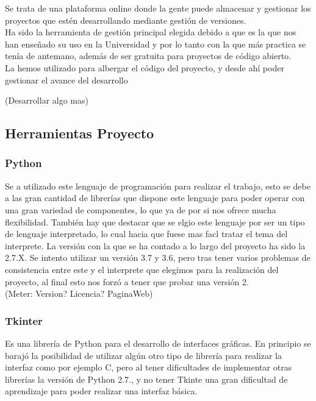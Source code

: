 Se trata de una plataforma online donde la gente puede almacenar y gestionar los proyectos que estén desarrollando mediante gestión de versiones.\\

Ha sido la herramienta de gestión principal elegida debido a que es la que nos han enseñado su uso en la Universidad y por lo tanto con la que más practica se tenía de antemano, además de ser gratuita para proyectos de código abierto.\\

La hemos utilizado para albergar el código del proyecto, y desde ahí poder gestionar el avance del desarrollo

(Desarrollar algo mas)

\subsection{Herramientas Proyecto}

\subsubsection{Python}

Se a utilizado este lenguaje de programación para realizar el trabajo, esto se debe a las gran cantidad de librerías que dispone este lenguaje para poder operar con una gran variedad de componentes, lo que ya de por si nos ofrece mucha flexibilidad. También hay que destacar que se elgio este lenguaje por ser un tipo de lenguaje interpretado, lo cual hacia que fuese mas facl tratar el tema del interprete.
La versión con la que se ha contado a lo largo del proyecto ha sido la 2.7.X. Se intento utilizar un versión 3.7 y 3.6, pero tras tener varios problemas de consistencia entre este y el interprete que elegimos para la realización del proyecto, al final esto nos forzó a tener que probar una versión 2.\\

(Meter: Version? Licencia? PaginaWeb)

\subsubsection{Tkinter}

Es una librería de Python para el desarrollo de interfaces gráficas. En principio se barajó la posibilidad de utilizar algún otro tipo de librería para realizar la interfaz como por ejemplo C, pero al tener dificultades de implementar otras librerías la versión de Python 2.7., y no tener Tkinte una gran dificultad de aprendizaje para poder realizar una interfaz básica.\\

